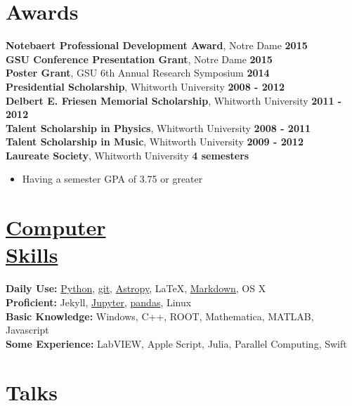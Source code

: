 \documentclass[margin]{res}
\begin{document}
\begin{resume}
\section{Awards}
{\bf Notebaert Professional Development Award}, Notre Dame  \hfill {\bf 2015}  \\
{\bf GSU Conference Presentation Grant}, Notre Dame  \hfill {\bf 2015}  \\
{\bf Poster Grant}, GSU 6th Annual Research Symposium \hfill {\bf 2014}  \\
{\bf Presidential Scholarship}, Whitworth University \hfill {\bf2008 - 2012} \\
{\bf Delbert E. Friesen Memorial Scholarship}, Whitworth University \hfill {\bf2011 - 2012} \\
{\bf Talent Scholarship in Physics}, Whitworth University \hfill {\bf2008 - 2011} \\
{\bf Talent Scholarship in Music}, Whitworth University \hfill {\bf2009 - 2012} \\
{\bf Laureate Society}, Whitworth University \hfill {\bf4 semesters}
\begin{itemize}  \itemsep -2pt %
     \item Having a semester GPA of 3.75 or greater
\end{itemize}








\section{\href{https://github.com/benjaminrose}{Computer \\Skills}}
{\bf Daily Use:} \href{https://www.python.org}{Python}, \href{https://git-scm.com}{git}, \href{http://www.astropy.org}{Astropy}, \LaTeX, \href{http://daringfireball.net/projects/markdown/}{Markdown}, OS X \\
{\bf Proficient:} Jekyll, \href{http://jupyter.org}{Jupyter}, \href{http://pandas.pydata.org}{pandas}, Linux \\
{\bf Basic Knowledge:} Windows, C++, ROOT, Mathematica, MATLAB, Javascript\\
{\bf Some Experience:} LabVIEW, Apple Script, Julia, Parallel Computing, Swift \\






\section{Talks}


\end{resume}
\end{document}

